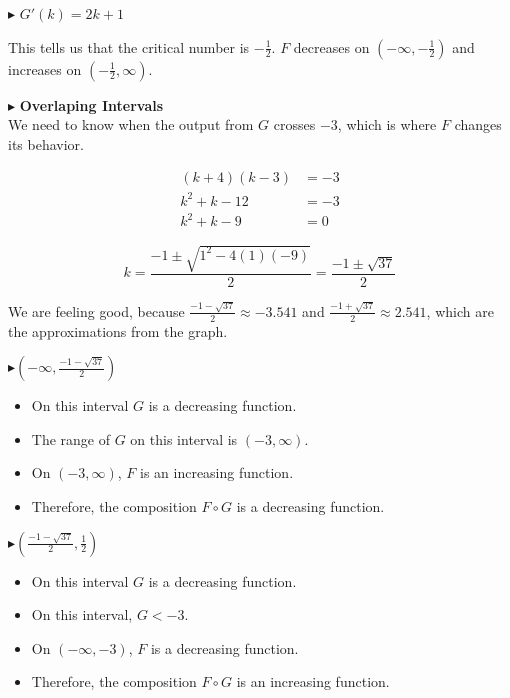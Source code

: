 \documentclass{ximera}
\begin{document}
\begin{example}
$\blacktriangleright$  $G'(k) = 2k + 1$

This tells us that the critical number is $-\frac{1}{2}$.  $F$ decreases on $(-\infty, -\frac{1}{2})$ and increases on $(-\frac{1}{2}, \infty)$.







\textbf{\textcolor{red!70!darkgray}{$\blacktriangleright$}} \textbf{\textcolor{purple!85!blue}{Overlaping Intervals}}  \\



We need to know when the output from $G$ crosses $-3$, which is where $F$ changes its behavior.





\begin{align*}
(k+4)(k-3) & = -3 \\
 k^2 + k - 12           & = -3  \\
 k^2 + k - 9         & = 0
\end{align*}


\[
k = \frac{-1 \pm \sqrt{1^2 - 4 (1) (-9)}}{2} = \frac{-1 \pm \sqrt{37}}{2} 
\]


We are feeling good, because $\frac{-1 - \sqrt{37}}{2} \approx -3.541$ and $\frac{-1 + \sqrt{37}}{2} \approx 2.541$, which are the approximations from the graph.






\textbf{\textcolor{blue!55!black}{$\blacktriangleright (-\infty, \frac{-1 - \sqrt{37}}{2})$}}


\begin{itemize}
\item On this interval $G$ is a decreasing function.
\item The range of $G$ on this interval is $(-3, \infty)$.
\item On $(-3, \infty)$, $F$ is an increasing function.
\item Therefore, the composition $F \circ G$ is a decreasing function.
\end{itemize}









\textbf{\textcolor{blue!55!black}{$\blacktriangleright (\frac{-1 - \sqrt{37}}{2}, \frac{1}{2})$}}


\begin{itemize}
\item On this interval $G$ is a decreasing function.
\item On this interval, $G < -3$.
\item On $(-\infty, -3)$, $F$ is a decreasing function.
\item Therefore, the composition $F \circ G$ is an increasing function.
\end{itemize}









\end{example}
\end{document}
